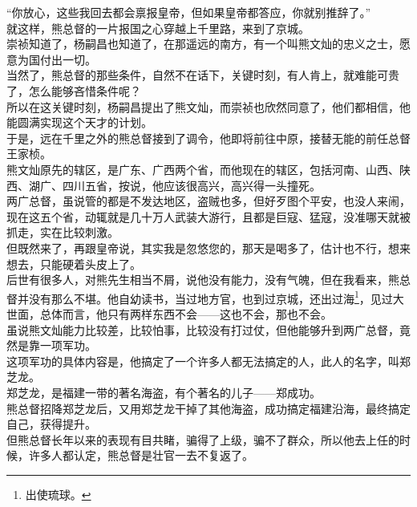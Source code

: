 \begin{multicols}{\theparacolNo}
“你放心，这些我回去都会禀报皇帝，但如果皇帝都答应，你就别推辞了。”\\

就这样，熊总督的一片报国之心穿越上千里路，来到了京城。\\

崇祯知道了，杨嗣昌也知道了，在那遥远的南方，有一个叫熊文灿的忠义之士，愿意为国付出一切。\\

当然了，熊总督的那些条件，自然不在话下，关键时刻，有人肯上，就难能可贵了，怎么能够吝惜条件呢？\\

所以在这关键时刻，杨嗣昌提出了熊文灿，而崇祯也欣然同意了，他们都相信，他能圆满实现这个天才的计划。\\

于是，远在千里之外的熊总督接到了调令，他即将前往中原，接替无能的前任总督王家桢。\\

熊文灿原先的辖区，是广东、广西两个省，而他现在的辖区，包括河南、山西、陕西、湖广、四川五省，按说，他应该很高兴，高兴得一头撞死。\\

两广总督，虽说管的都是不发达地区，盗贼也多，但好歹图个平安，也没人来闹，现在这五个省，动辄就是几十万人武装大游行，且都是巨寇、猛寇，没准哪天就被抓走，实在比较刺激。\\

但既然来了，再跟皇帝说，其实我是忽悠您的，那天是喝多了，估计也不行，想来想去，只能硬着头皮上了。\\

后世有很多人，对熊先生相当不屑，说他没有能力，没有气魄，但在我看来，熊总督并没有那么不堪。他自幼读书，当过地方官，也到过京城，还出过海\footnote{出使琉球。}，见过大世面，总体而言，他只有两样东西不会——这也不会，那也不会。\\

虽说熊文灿能力比较差，比较怕事，比较没有打过仗，但他能够升到两广总督，竟然是靠一项军功。\\

这项军功的具体内容是，他搞定了一个许多人都无法搞定的人，此人的名字，叫郑芝龙。\\

郑芝龙，是福建一带的著名海盗，有个著名的儿子——郑成功。\\

熊总督招降郑芝龙后，又用郑芝龙干掉了其他海盗，成功搞定福建沿海，最终搞定自己，获得提升。\\

但熊总督长年以来的表现有目共睹，骗得了上级，骗不了群众，所以他去上任的时候，许多人都认定，熊总督是壮官一去不复返了。\\


\end{multicols}
